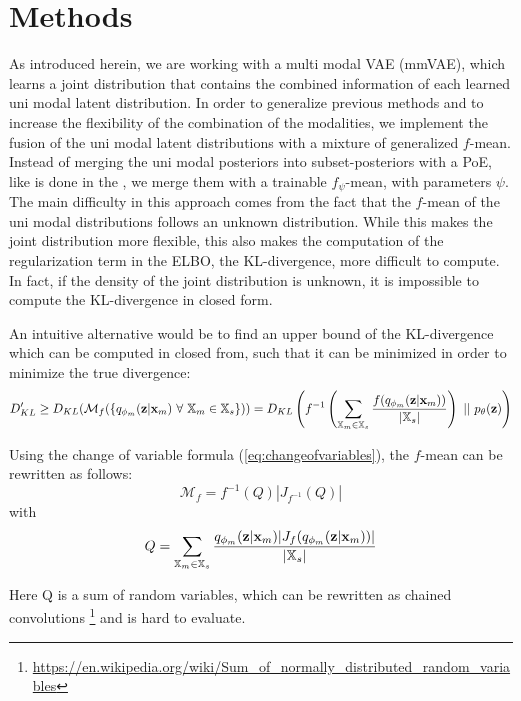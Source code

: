 \section{Methods}
\label{sec:methods}
As introduced herein, we are working with a multi modal VAE (mmVAE), which learns a joint distribution that contains the combined information of each learned uni modal latent distribution.
In order to generalize previous methods and to increase the flexibility of the combination of the modalities, we implement the fusion of the uni modal latent distributions with a mixture of generalized $f$-mean.
Instead of merging the uni modal posteriors into subset-posteriors with a PoE, like is done in the , we merge them with a trainable $f_{\psi}$-mean, with parameters $\psi$.
The main difficulty in this approach comes from the fact that the $f$-mean of the uni modal distributions follows an unknown distribution.
While this makes the joint distribution more flexible, this also makes the computation of the regularization term in the ELBO, the KL-divergence, more difficult to compute.
In fact, if the density of the joint distribution is unknown, it is impossible to compute the KL-divergence in closed form.

An intuitive alternative would be to find an upper bound of the KL-divergence which can be computed in closed from, such that it can be minimized in order to minimize the true divergence:
\begin{equation}
    \label{eq:kldivbound}
    D_{KL}^{\prime} \geq D_{KL}(\mathcal{M}_f(\{\unimodalpost\ \forall\ \xsetm \in \xsubset\})) =  D_{KL}\left(f^{-1}\left(\sum _{\xsetm \in \xsubset} \frac{f(\unimodalpost)}{|\xsubset|}\right)\ ||\ \prior\right)
\end{equation}

Using the change of variable formula (\cref{eq:changeofvariables}), the $f$-mean can be rewritten as follows:
\begin{equation}
    \mathcal{M}_f = f^{-1}(Q)|J_{f^{-1}}(Q)|
\end{equation}
with
\begin{equation}
    Q= \sum _{\mathbb{X}_m \in \mathbb{X}_s} \frac{q_{\phi_m}(\textbf{z}|\textbf{x}_m)|J_f(q_{\phi_m}(\textbf{z}|\textbf{x}_m))|}{|\mathbb{X}_s|}
\end{equation}

Here Q is a sum of random variables, which can be rewritten as chained convolutions \footnote{\url{https://en.wikipedia.org/wiki/Sum_of_normally_distributed_random_variables}} and is hard to evaluate.

